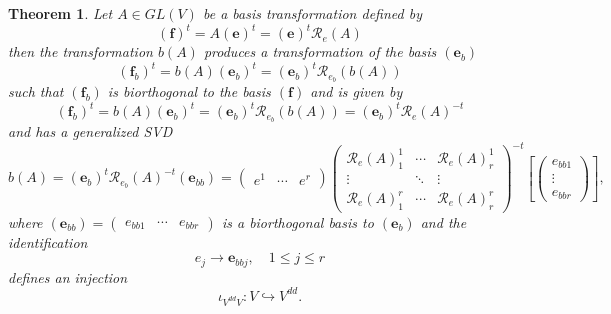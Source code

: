 \documentclass[aps,preprint]{revtex4}
\newtheorem{theorem}{Theorem}
\begin{document}
\begin{theorem}
\label{Biorthogonality Theorem} Let $A\in GL\left( V\right) $ be a basis
transformation defined by 
\begin{equation}
\left( \boldsymbol{f}\right) ^{t}=A\left( \boldsymbol{e}\right) ^{t}=\left( 
\boldsymbol{e}\right) ^{t}\mathcal{R}_{e}\left( A\right)
\end{equation}%
then the transformation $b\left( A\right) $ produces a transformation of the
basis $\left( \boldsymbol{e}_{b}\right) $ 
\begin{equation}
\left( \boldsymbol{f}_{b}\right) ^{t}=b\left( A\right) \left( \boldsymbol{e}%
_{b}\right) ^{t}=\left( \boldsymbol{e}_{b}\right) ^{t}\mathcal{R}%
_{e_{b}}\left( b\left( A\right) \right)
\end{equation}%
such that $\left( \boldsymbol{f}_{b}\right) $ is biorthogonal to the basis $%
\left( \boldsymbol{f}\right) $ and is given by 
\begin{equation}
\left( \boldsymbol{f}_{b}\right) ^{t}=b\left( A\right) \left( \boldsymbol{e}%
_{b}\right) ^{t}=\left( \boldsymbol{e}_{b}\right) ^{t}\mathcal{R}%
_{e_{b}}\left( b\left( A\right) \right) =\left( \boldsymbol{e}_{b}\right)
^{t}\mathcal{R}_{e}\left( A\right) ^{-t}
\end{equation}%
and has a generalized SVD 
\begin{equation}
b\left( A\right) =\left( \boldsymbol{e}_{b}\right) ^{t}\mathcal{R}%
_{e_{b}}\left( A\right) ^{-t}\left( \boldsymbol{e}_{bb}\right) =\left( 
\begin{array}{ccc}
e^{1} & \cdots & e^{r}%
\end{array}%
\right) \left( 
\begin{array}{ccc}
\mathcal{R}_{e}\left( A\right) _{1}^{1} & \cdots & \mathcal{R}_{e}\left(
A\right) _{r}^{1} \\ 
\vdots & \ddots & \vdots \\ 
\mathcal{R}_{e}\left( A\right) _{1}^{r} & \cdots & \mathcal{R}_{e}\left(
A\right) _{r}^{r}%
\end{array}%
\right) ^{-t}\left[ \left( 
\begin{array}{c}
e_{bb1} \\ 
\vdots \\ 
e_{bbr}%
\end{array}%
\right) \right] ,
\end{equation}%
where $\left( \boldsymbol{e}_{bb}\right) =\left( 
\begin{array}{ccc}
e_{bb1} & \cdots & e_{bbr}%
\end{array}%
\right) $ is a biorthogonal basis to $\left( \boldsymbol{e}_{b}\right) $ and
the identification 
\begin{equation}
e_{j}\rightarrow \boldsymbol{e}_{bbj},\quad 1\leq j\leq r
\end{equation}%
defines an injection 
\begin{equation}
\iota _{V^{dd}V}:V\hookrightarrow V^{dd}.
\end{equation}
\end{theorem}
\end{document}
